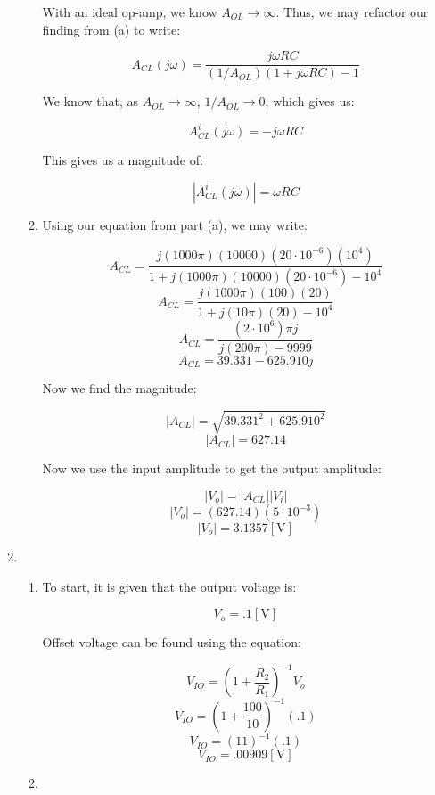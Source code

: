 \begin{enumerate}
\begin{enumerate}
        With an ideal op-amp, we know $A_{OL}\to\infty$. Thus, we may refactor our finding from (a) to write:

        $$A_{CL}(j\omega)=\frac{j\omega RC}{(1/A_{OL})(1+j\omega RC)-1}$$

        We know that, as $A_{OL}\to\infty$, $1/A_{OL}\to0$, which gives us:

        $$A_{CL}^i(j\omega)=-j\omega RC$$

        This gives us a magnitude of:

        $$\boxed{|A_{CL}^i(j\omega)|=\omega RC}$$

      \item 

        Using our equation from part (a), we may write:

        $$A_{CL}=\frac{j(1000\pi)(10000)(20\cdot10^{-6})(10^4)}{1+j(1000\pi)(10000)(20\cdot10^{-6})-10^4}$$
        $$A_{CL}=\frac{j(1000\pi)(100)(20)}{1+j(10\pi)(20)-10^4}$$
        $$A_{CL}=\frac{(2\cdot10^6)\pi j}{j(200\pi)-9999}$$
        $$A_{CL}=39.331-625.910j$$

        Now we find the magnitude:

        $$|A_{CL}|=\sqrt{39.331^2+625.910^2}$$
        $$|A_{CL}|=627.14$$

        Now we use the input amplitude to get the output amplitude:

        $$|V_o|=|A_{CL}||V_i|$$
        $$|V_o|=(627.14)(5\cdot10^{-3})$$
        $$\boxed{|V_o|=3.1357[\si{\volt}]}$$

    \end{enumerate}

  \item

    \begin{enumerate}

      \item 

        To start, it is given that the output voltage is:

        $$V_o=.1[\si{\volt}]$$

        Offset voltage can be found using the equation:

        $$V_{IO}=\left( 1+\frac{R_2}{R_1} \right)^{-1}V_o$$
        $$V_{IO}=\left( 1+\frac{100}{10} \right)^{-1}(.1)$$
        $$V_{IO}=\left( 11 \right)^{-1}(.1)$$
        $$\boxed{V_{IO}=.00909[\si{\volt}]}$$

      \item 


\end{enumerate}
\end{enumerate}
